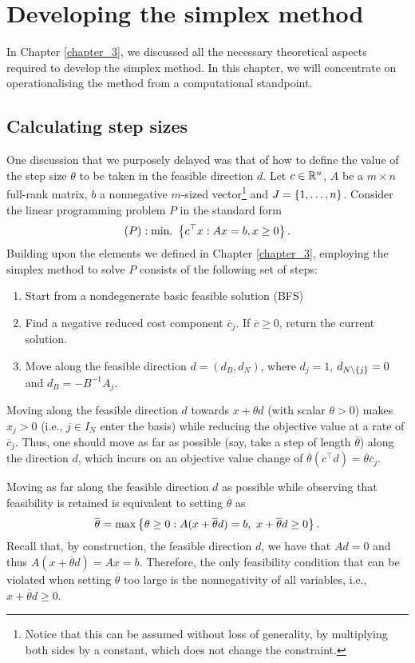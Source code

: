 \section{Developing the simplex method}

In Chapter \ref{chapter_3}, we discussed all the necessary theoretical aspects required to develop the simplex method. In this chapter, we will concentrate on operationalising the method from a computational standpoint.

\subsection{Calculating step sizes}

One discussion that we purposely delayed was that of how to define the value of the step size $\theta$ to be taken in the feasible direction $d$. Let $c \in \mathbb{R}^n$, $A$ be a $m \times n$ full-rank matrix, $b$ a nonnegative $m$-sized vector\footnote{Notice that this can be assumed without loss of generality, by multiplying both sides by a constant, which does not change the constraint.} and $J = \left\{ 1,\dots,n \right \}$. Consider the linear programming problem $P$ in the standard form 
%
	\begin{equation*}
		(P) : \mathop{\text{min.~}}\left\{ c^\top x : Ax = b, x \geq 0 \right \}.
	\end{equation*}
%
Building upon the elements we defined in Chapter \ref{chapter_3}, employing the simplex method to solve $P$ consists of the following set of steps:
%
\begin{enumerate}
	\item Start from a nondegenerate basic feasible solution (BFS)
	\item Find a negative reduced cost component $\overline{c}_j$. If $\overline{c} \geq 0$, return the current solution. 
	\item Move along the feasible direction $d = (d_B, d_N)$, where $d_j = 1$, $d_{N \setminus \left\{ j \right \}} = 0$ and $d_B = -B^{-1}A_j$.
\end{enumerate}
%
Moving along the feasible direction $d$ towards $x + \theta d$ (with scalar $\theta > 0$) makes $x_j >0$ (i.e., $j \in I_N$ enter the basis) while reducing the objective value at a rate of $\overline{c}_j$. Thus, one should move as far as possible (say, take a step of length $\overline{\theta}$) along the direction $d$, which incurs on an objective value change of $\overline{\theta} (c^\top d) = \overline{\theta} \overline{c}_j$.

Moving as far along the feasible direction $d$ as possible while observing that feasibility is retained is equivalent to setting $\overline{\theta}$ as 	
%
\begin{equation*}
	\overline{\theta} = \max\left\{ \theta \geq 0 : A(x + \overline{\theta} d) = b, \ x + \overline{\theta}d \geq 0 \right \}.	
\end{equation*}
%
Recall that, by construction, the feasible direction $d$, we have that $Ad = 0$ and thus $A(x + \overline{\theta} d) = Ax = b$. Therefore, the only feasibility condition that can be violated when setting $\overline{\theta}$ too large is the nonnegativity of all variables, i.e., $x + \overline{\theta}d \geq 0$. 

